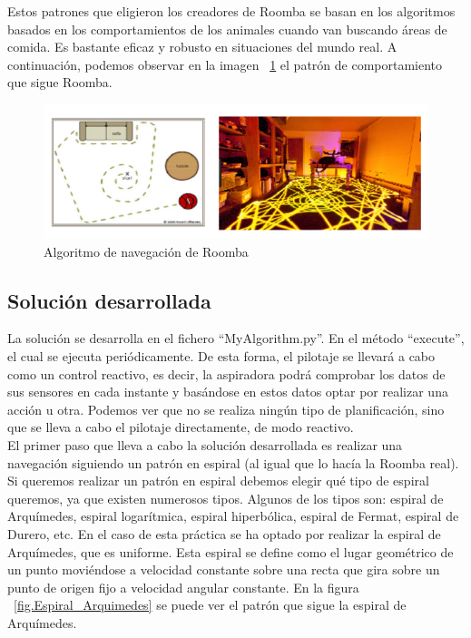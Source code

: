 Estos patrones que eligieron los creadores de Roomba se basan en los algoritmos basados en los comportamientos de los animales cuando van buscando áreas de comida. Es bastante eficaz y robusto en situaciones del mundo real. A continuación, podemos observar en la imagen ~\ref{fig.Algoritmo_roomba} el patrón de comportamiento que sigue Roomba.\\

\begin{figure}[H]
  \begin{center}
    \includegraphics[width=1\textwidth]{figures/Vacuum/Algoritmo_roomba.png}
		\caption{Algoritmo de navegación de Roomba}
		\label{fig.Algoritmo_roomba}
		\end{center}
\end{figure}

\subsection{Solución desarrollada}
La solución se desarrolla en el fichero ``MyAlgorithm.py''. En el método ``execute'', el cual se ejecuta periódicamente. De esta forma, el pilotaje se llevará a cabo como un control reactivo, es decir, la aspiradora podrá comprobar los datos de sus sensores en cada instante y basándose en estos datos optar por realizar una acción u otra. Podemos ver que no se realiza ningún tipo de planificación, sino que se lleva a cabo el pilotaje directamente, de modo reactivo.\\

El primer paso que lleva a cabo la solución desarrollada es realizar una navegación siguiendo un patrón en espiral (al igual que lo hacía la Roomba real). Si queremos realizar un patrón en espiral debemos elegir qué tipo de espiral queremos, ya que existen numerosos tipos. Algunos de los tipos son: espiral de Arquímedes, espiral logarítmica, espiral hiperbólica, espiral de Fermat, espiral de Durero, etc. En el caso de esta práctica se ha optado por realizar la espiral de Arquímedes, que es uniforme. Esta espiral se define como el lugar geométrico de un punto moviéndose a velocidad constante sobre una recta que gira sobre un punto de origen fijo a velocidad angular constante. En la figura ~\ref{fig.Espiral_Arquimedes} se puede ver el patrón que sigue la espiral de Arquímedes.\\

